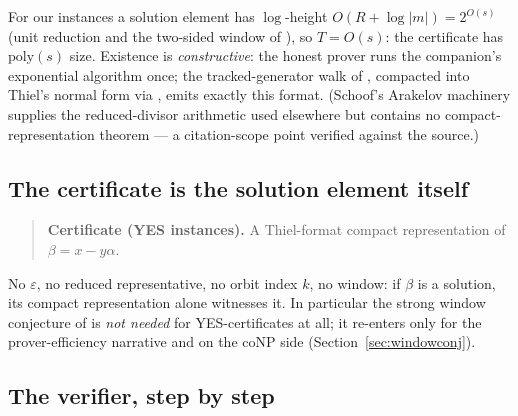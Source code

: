 \documentclass[11pt]{amsart}
\theoremstyle{plain}
\theoremstyle{remark}
\begin{document}
For our instances a solution element has $\log$-height
$O(R + \log|m|) = 2^{O(s)}$ (unit reduction and the two-sided window
of \cite[Lemmas U and C]{companion}), so $T = O(s)$: the certificate
has $\mathrm{poly}(s)$ size. Existence is \emph{constructive}: the
honest prover runs the companion's exponential algorithm once; the
tracked-generator walk of \cite[Lemma~A$'$]{companion}, compacted
into Thiel's normal form via \cite[Alg.~7]{BF14}, emits exactly this
format. (Schoof's Arakelov machinery \cite{Sch08} supplies the
reduced-divisor arithmetic used elsewhere but contains no
compact-representation theorem --- a citation-scope point verified
against the source.)

\subsection{The certificate is the solution element itself}
\label{sec:certisbeta}

\begin{quote}
\textbf{Certificate (YES instances).} A Thiel-format compact
representation of $\beta = x - y\alpha$.
\end{quote}

No $\varepsilon$, no reduced representative, no orbit index $k$, no
window: if $\beta$ is a solution, its compact representation alone
witnesses it. In particular the strong window conjecture of
\cite[Remark~7.4]{companion} is \emph{not needed} for
YES-certificates at all; it re-enters only for the prover-efficiency
narrative and on the coNP side (Section~\ref{sec:windowconj}).

\subsection{The verifier, step by step}\label{sec:verifier}
\end{document}
